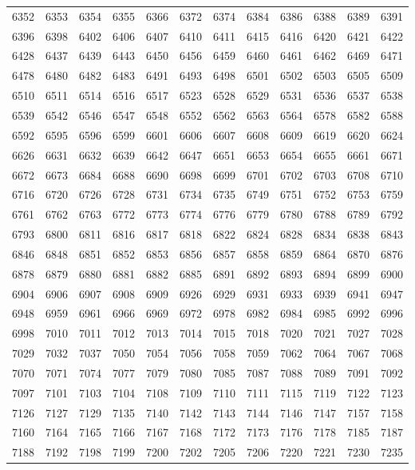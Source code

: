 \begin{center}
\begin{longtable}{llllllllllll}
6352 &6353 &6354 &6355 &6366 &6372 &6374 &6384 &6386 &6388 &6389 &6391 \\
6396 &6398 &6402 &6406 &6407 &6410 &6411 &6415 &6416 &6420 &6421 &6422 \\
6428 &6437 &6439 &6443 &6450 &6456 &6459 &6460 &6461 &6462 &6469 &6471 \\
6478 &6480 &6482 &6483 &6491 &6493 &6498 &6501 &6502 &6503 &6505 &6509 \\
6510 &6511 &6514 &6516 &6517 &6523 &6528 &6529 &6531 &6536 &6537 &6538 \\
6539 &6542 &6546 &6547 &6548 &6552 &6562 &6563 &6564 &6578 &6582 &6588 \\
6592 &6595 &6596 &6599 &6601 &6606 &6607 &6608 &6609 &6619 &6620 &6624 \\
6626 &6631 &6632 &6639 &6642 &6647 &6651 &6653 &6654 &6655 &6661 &6671 \\
6672 &6673 &6684 &6688 &6690 &6698 &6699 &6701 &6702 &6703 &6708 &6710 \\
6716 &6720 &6726 &6728 &6731 &6734 &6735 &6749 &6751 &6752 &6753 &6759 \\
6761 &6762 &6763 &6772 &6773 &6774 &6776 &6779 &6780 &6788 &6789 &6792 \\
6793 &6800 &6811 &6816 &6817 &6818 &6822 &6824 &6828 &6834 &6838 &6843 \\
6846 &6848 &6851 &6852 &6853 &6856 &6857 &6858 &6859 &6864 &6870 &6876 \\
6878 &6879 &6880 &6881 &6882 &6885 &6891 &6892 &6893 &6894 &6899 &6900 \\
6904 &6906 &6907 &6908 &6909 &6926 &6929 &6931 &6933 &6939 &6941 &6947 \\
6948 &6959 &6961 &6966 &6969 &6972 &6978 &6982 &6984 &6985 &6992 &6996 \\
6998 &7010 &7011 &7012 &7013 &7014 &7015 &7018 &7020 &7021 &7027 &7028 \\
7029 &7032 &7037 &7050 &7054 &7056 &7058 &7059 &7062 &7064 &7067 &7068 \\
7070 &7071 &7074 &7077 &7079 &7080 &7085 &7087 &7088 &7089 &7091 &7092 \\
7097 &7101 &7103 &7104 &7108 &7109 &7110 &7111 &7115 &7119 &7122 &7123 \\
7126 &7127 &7129 &7135 &7140 &7142 &7143 &7144 &7146 &7147 &7157 &7158 \\
7160 &7164 &7165 &7166 &7167 &7168 &7172 &7173 &7176 &7178 &7185 &7187 \\
7188 &7192 &7198 &7199 &7200 &7202 &7205 &7206 &7220 &7221 &7230 &7235 \\

\end{longtable}
\end{center}

